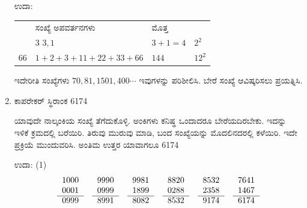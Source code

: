 \begin{enumerate}
ಉದಾ:

\begin{tabular}[t]{llll}
& ಸಂಖ್ಯೆ  \quad ಅಪವರ್ತನಗಳು & ಮೊತ್ತ & \\
 & $3$ \quad\qquad $3, 1$ & $3 + 1 = 4$ & $2^{2}$\\
$66$ & $1+2+3+11+22+33+66$ & $144$ & $12^{2}$
\end{tabular}

\vskip 0.3cm
ಇದೇರೀತಿ ಸಂಖ್ಯೆಗಳು $70, 81, 1501, 400 \cdots$ ಇವುಗಳನ್ನು ಪರಿಶೀಲಿಸಿ. ಬೇರೆ ಸಂಖ್ಯೆ ಆವಿಷ್ಕರಿಸಲು ಪ್ರಯತ್ನಿಸಿ. 

\item ಕಾಪರೇಕರ್ ಸ್ಥಿರಾಂಕ 6174

ಯಾವುದೇ ನಾಲ್ಕಂಕಿಯ ಸಂಖ್ಯೆ ತೆಗೆದುಕೊಳ್ಳಿ. ಅಂಕಿಗಳು ಕನಿಷ್ಥ ಒಂದಾದರೂ ಬೇರೆಯದಿರಬೇಕು. ಇದನ್ನು ಇಳಿಕೆ ಕ್ರಮದಲ್ಲಿ ಬರೆಯಿರಿ. ತಿರುವು ಮುರುವು ಮಾಡಿ, ಬಂದ ಸಂಖ್ಯೆಯನ್ನು ಮೊದಲಿನದರಲ್ಲಿ ಕಳೆಯಿರಿ. ಇದೇ ಪ್ರಕ್ರಿಯೆ ಮುಂದುವರಿಸಿ. ಅಂತಿಮ ಉತ್ತರ ಯಾವಾಗಲೂ 6174

ಉದಾ: (1)
\begin{equation*}
\begin{tabular}[t]{r}
1000 \\
0001\\\cline{1-1} 
0999
\end{tabular}
\quad
\begin{tabular}[t]{r}
9990\\ 
0999\\\cline{1-1} 
8991
\end{tabular}
\quad
\begin{tabular}[t]{r}
9981\\ 
1899\\\cline{1-1} 
8082
\end{tabular}
\quad
\begin{tabular}[t]{r}
8820\\ 
0288\\\cline{1-1} 
8532
\end{tabular}
\quad
\begin{tabular}[t]{r}
8532\\ 
2358\\\cline{1-1} 
9174
\end{tabular}
\quad
\begin{tabular}[t]{r}
7641\\ 
1467\\\cline{1-1} 
6174
\end{tabular}
\end{equation*}


\end{enumerate}
